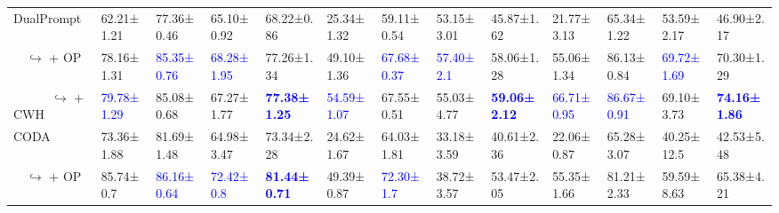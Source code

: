 \begin{table*}[t]
{\begin{tabular}{l|llla|llla|llla}
\hline
DualPrompt                                   & 62.21{\scriptsize±1.21}                      & 77.36{\scriptsize±0.46}                           & 65.10{\scriptsize±0.92}                    & 68.22{\scriptsize±0.86}  & 25.34{\scriptsize±1.32}                   & 59.11{\scriptsize±0.54}                   & 53.15{\scriptsize±3.01}                       & 45.87{\scriptsize±1.62}   & 21.77{\scriptsize±3.13}                   & 65.34{\scriptsize±1.22}                   & 53.59{\scriptsize±2.17}                       & 46.90{\scriptsize±2.17} \\  
\ \  $\hookrightarrow$ + OP                  & 78.16{\scriptsize±1.31}                      & \textcolor{blue}{85.35{\scriptsize±0.76}}         & \textcolor{blue}{68.28{\scriptsize±1.95}}  & 77.26{\scriptsize±1.34}  & 49.10{\scriptsize±1.36}                   & \textcolor{blue}{67.68{\scriptsize±0.37}} & \textcolor{blue}{57.40{\scriptsize±2.1}}      & 58.06{\scriptsize±1.28}   & 55.06{\scriptsize±1.34}                   & 86.13{\scriptsize±0.84}                   & \textcolor{blue}{69.72{\scriptsize±1.69}}     & 70.30{\scriptsize±1.29} \\    
\ \ \ \ \ \ $\hookrightarrow$ + CWH          & \textcolor{blue}{79.78{\scriptsize±1.29}}    & 85.08{\scriptsize±0.68}                           & 67.27{\scriptsize±1.77}                    & \textbf{\textcolor{blue}{77.38{\scriptsize±1.25}}}  & \textcolor{blue}{54.59{\scriptsize±1.07}} & 67.55{\scriptsize±0.51}                   & 55.03{\scriptsize±4.77}                       & \textbf{\textcolor{blue}{59.06{\scriptsize±2.12}}}   & \textcolor{blue}{66.71{\scriptsize±0.95}} & \textcolor{blue}{86.67{\scriptsize±0.91}} & 69.10{\scriptsize±3.73}                       & \textbf{\textcolor{blue}{74.16{\scriptsize±1.86}}} \\  
\hline
CODA                                         & 73.36{\scriptsize±1.88}                      & 81.69{\scriptsize±1.48}                           & 64.98{\scriptsize±3.47}                    & 73.34{\scriptsize±2.28}  & 24.62{\scriptsize±1.67}                   & 64.03{\scriptsize±1.81}                   & 33.18{\scriptsize±3.59}                       & 40.61{\scriptsize±2.36}   & 22.06{\scriptsize±0.87}                   & 65.28{\scriptsize±3.07}                   & 40.25{\scriptsize±12.5}                       & 42.53{\scriptsize±5.48} \\  
\ \  $\hookrightarrow$ + OP                  & 85.74{\scriptsize±0.7}                       & \textcolor{blue}{86.16{\scriptsize±0.64}}         & \textcolor{blue}{72.42{\scriptsize±0.8}}   & \textbf{\textcolor{blue}{81.44{\scriptsize±0.71}}}  & 49.39{\scriptsize±0.87}                   & \textcolor{blue}{72.30{\scriptsize±1.7}}  & 38.72{\scriptsize±3.57}                       & 53.47{\scriptsize±2.05}   & 55.35{\scriptsize±1.66}                   & 81.21{\scriptsize±2.33}                   & 59.59{\scriptsize±8.63}                       & 65.38{\scriptsize±4.21} \\    

\end{tabular}}
\end{table*}
